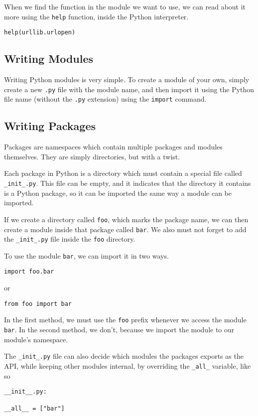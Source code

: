 \documentclass[a4paper,oneside]{book}
\numberwithin{equation}{chapter}
\begin{document}
When we find the function in the module we want to use, we can read about it more using the \texttt{help} function, inside the Python interpreter.
\begin{verbatim}
help(urllib.urlopen)
\end{verbatim}
\subsection{Writing Modules}
Writing Python modules is very simple. To create a module of your own, simply create a new \texttt{.py} file with the module name, and then import it using the Python file name (without the \texttt{.py} extension) using the \texttt{import} command.
\subsection{Writing Packages}
Packages are namespaces which contain multiple packages and modules themselves. They are simply directories, but with a twist.

Each package in Python is a directory which must contain a special file called \verb|_init_.py|. This file can be empty, and it indicates that the directory it contains is a Python package, so it can be imported the same way a module can be imported.

If we create a directory called \texttt{foo}, which marks the package name, we can then create a module inside that package called \texttt{bar}. We also must not forget to add the \verb|_init_.py| file inside the \texttt{foo} directory.

To use the module \texttt{bar}, we can import it in two ways.
\begin{verbatim}
import foo.bar
\end{verbatim}
or
\begin{verbatim}
from foo import bar
\end{verbatim}

In the first method, we must use the \texttt{foo} prefix whenever we access the module \texttt{bar}. In the second method, we don't, because we import the module to our module's namespace.

The \verb|_init_.py| file can also decide which modules the packages exports as the API, while keeping other modules internal, by overriding the \verb|_all_| variable, like so
\begin{verbatim}
__init__.py:

__all__ = ["bar"]
\end{verbatim}
\end{document}
